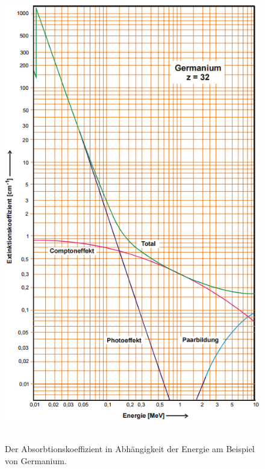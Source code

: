 \begin{figure}[H]
	\centering
	\includegraphics[height=20cm]{picture/Absorbtionskoeffizient.PNG}
	\caption{Der Absorbtionskoeffizient in Abhängigkeit der Energie am Beispiel von Germanium. \cite[7]{sample}}
	\label{fig:Absorbtionskoeffizient}
\end{figure}


